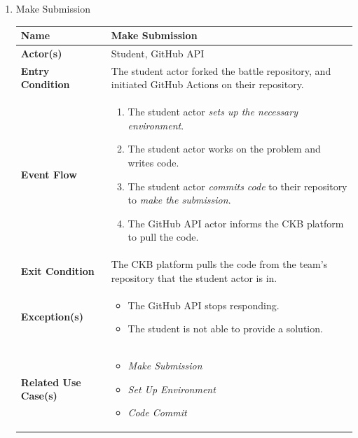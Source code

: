 \begin{enumerate}
\item Make Submission
\begin{center}
    \begin{tabular}{ | m{10em} | m{10cm}| } 
      \hline
      \textbf{Name} & Make Submission  \\ 
      \hline
      \textbf{Actor(s)} & Student, GitHub API \\ 
      \hline
      \textbf{Entry Condition} & The student actor forked the battle repository, and initiated GitHub Actions on their repository. \\ 
      \hline
      \textbf{Event Flow} & 
          \begin{enumerate}[(1)]
              \item The student actor \textit{sets up the necessary environment}.
              \item The student actor works on the problem and writes code. 
              \item The student actor \textit{commits code} to their repository to \textit{make the submission}.
              \item The GitHub API actor informs the CKB platform to pull the code.
          \end{enumerate}
      \\ 
      \hline
      \textbf{Exit Condition} & The CKB platform pulls the code from the team's repository that the student actor is in. \\ 
      \hline
      \textbf{Exception(s)} & 
      \begin{itemize}
          \item The GitHub API stops responding.
          \item The student is not able to provide a solution.
      \end{itemize}
          \\ 
      \hline
      \textbf{Related Use Case(s)} & 
      \begin{itemize}
          \item \textit{Make Submission}
          \item \textit{Set Up Environment}
          \item \textit{Code Commit}
      \end{itemize}
          \\ 
      \hline
    \end{tabular}
\end{center}


\end{enumerate}
